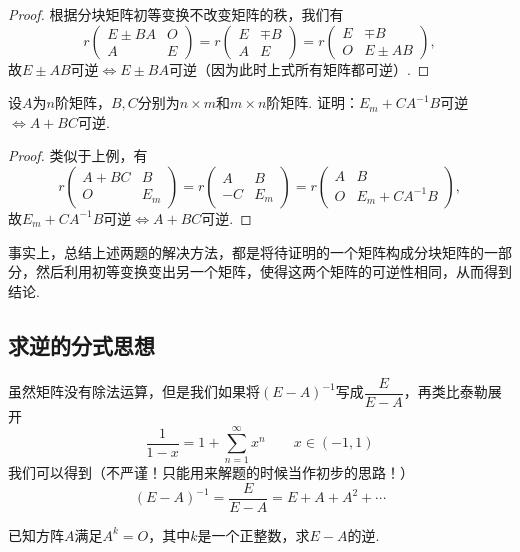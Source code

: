 \begin{proof}
    根据分块矩阵初等变换不改变矩阵的秩，我们有
    \[r\begin{pmatrix}
        E\pm BA & O \\ A & E
    \end{pmatrix}=r\begin{pmatrix}
        E & \mp B \\ A & E
    \end{pmatrix}=r\begin{pmatrix}
        E & \mp B \\ O & E\pm AB
    \end{pmatrix},\]
    故$E\pm AB$可逆$\iff E\pm BA$可逆（因为此时上式所有矩阵都可逆）.
\end{proof}

\begin{example}
    设$A$为$n$阶矩阵，$B,C$分别为$n \times m$和$m \times n$阶矩阵. 证明：$E_m+CA^{-1}B$可逆$\iff A+BC$可逆.
\end{example}

\begin{proof}
    类似于上例，有
    \[r\begin{pmatrix}
        A+BC & B \\ O & E_m
    \end{pmatrix}=r\begin{pmatrix}
        A & B \\ -C & E_m
    \end{pmatrix}=r\begin{pmatrix}
        A & B \\ O & E_m+CA^{-1}B
    \end{pmatrix},\]
    故$E_m+CA^{-1}B$可逆$\iff A+BC$可逆.
\end{proof}

事实上，总结上述两题的解决方法，都是将待证明的一个矩阵构成分块矩阵的一部分，然后利用初等变换变出另一个矩阵，使得这两个矩阵的可逆性相同，从而得到结论.

\subsection{求逆的分式思想}

虽然矩阵没有除法运算，但是我们如果将$(E-A)^{-1}$写成$\dfrac{E}{E-A}$，再类比泰勒展开
\[\frac{1}{1-x}=1+\sum_{n=1}^\infty x^n \qquad x\in (-1,1)\]
我们可以得到（不严谨！只能用来解题的时候当作初步的思路！）
\[(E-A)^{-1}=\frac{E}{E-A}=E+A+A^2+\cdots\]

\begin{example}
    已知方阵$A$满足$A^k=O$，其中$k$是一个正整数，求$E-A$的逆.
\end{example}

